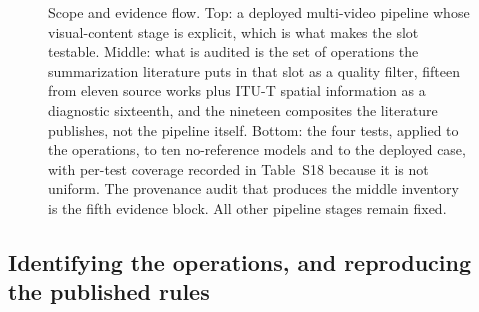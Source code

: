 \begin{figure}[!ht]
{}
\caption{Scope and evidence flow. Top: a deployed multi-video pipeline whose visual-content stage is
explicit, which is what makes the slot testable. Middle: what is
audited is the set of operations the summarization literature puts in that slot as a quality filter, fifteen from eleven
source works plus ITU-T spatial information as a diagnostic sixteenth, and the nineteen
composites the literature publishes, not the pipeline itself. Bottom: the four tests, applied to the operations, to ten no-reference models and to the
deployed case, with per-test coverage recorded in Table~S18 because it is not uniform. The
provenance audit that produces the middle inventory is the fifth evidence block. All
other pipeline stages remain fixed.}
\label{fig:overview}
\end{figure}

\subsection{Identifying the operations, and reproducing the published rules}\label{sec:prov}

